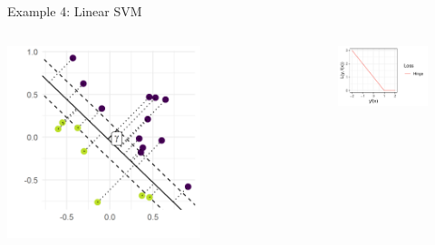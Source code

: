 \documentclass[11pt,compress,t,notes=noshow, xcolor=table]{beamer}
\begin{document}
\begin{vbframe}{Example 4: Linear SVM}
\begin{columns}[T] %
	\begin{column}{.5\textwidth}
		\begin{center}
			\includegraphics[width=0.7\textwidth]{figure_man/svm_geometry.png} 
		\end{center}
	\end{column} 
	\begin{column}{.5\textwidth}
	\begin{figure}
	\begin{center}
	\vspace*{0.5cm}
		\includegraphics[width=1\textwidth]{figure_man/hinge.pdf}
	\end{center}
		\end{figure}
	\end{column}
\end{columns}
\end{vbframe}
\end{document}
